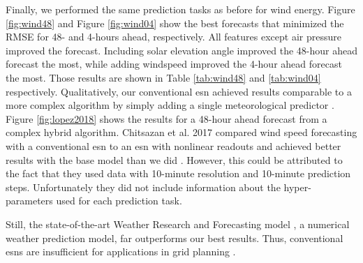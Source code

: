 Finally, we performed the same prediction tasks as before for wind energy.
Figure \ref{fig:wind48} and Figure \ref{fig:wind04} show the best forecasts
that minimized the RMSE for
48- and 4-hours ahead, respectively. All features except air pressure improved
the forecast. Including solar elevation angle improved the 48-hour ahead
forecast the most, while adding windspeed improved the 4-hour ahead forecast
the most. Those results are shown in Table \ref{tab:wind48} and \ref{tab:wind04}
respectively. Qualitatively, our conventional \gls{esn} achieved results
comparable to a more complex algorithm by simply adding a single meteorological
predictor \cite{lopez_wind_2018}. Figure \ref{fig:lopez2018} shows the results for a 48-hour ahead forecast from a complex hybrid algorithm.
Chitsazan et al. 2017 compared wind speed forecasting with a conventional
\gls{esn} to an \gls{esn} with nonlinear readouts and achieved better results
with the base model than we did \cite{chitsazan_wind_2017}. However, this could
be attributed to the fact that they used data with 10-minute resolution and
10-minute prediction steps. Unfortunately they did not include information about
the hyper-parameters used for each prediction task.

Still, the state-of-the-art Weather Research and Forecasting model
\cite{powers_weather_2017}, a numerical weather prediction model, far
outperforms our best results. Thus, conventional \glspl{esn} are insufficient
for applications in grid planning \cite{wang_quantifying_2016}.

\begin{figure*}[h]
  \centering
  
  \caption{The optimized 48-hour ahead wind energy prediction that minimized
  the RMSE. The inputs for this forecast were wind energy and solar elevation
  angle. \textit{Hyperparameters}: Reservoir Size:1000, Sparsity: 0.1, Spectral
  Radius: 0.9, Noise: 0.0001, Training Length: 19100, Prediction Window: 48,
  Random state: 85}
  \label{fig:wind48}
\end{figure*}

